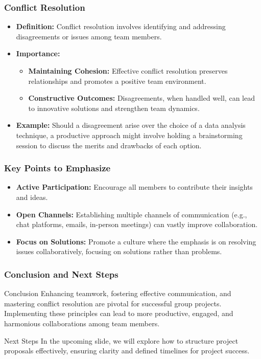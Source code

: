\documentclass[aspectratio=169]{beamer}
\begin{document}
\begin{frame}[fragile]
    \frametitle{Conflict Resolution}
    \begin{itemize}
        \item \textbf{Definition:} Conflict resolution involves identifying and addressing disagreements or issues among team members.
        
        \item \textbf{Importance:}
            \begin{itemize}
                \item \textbf{Maintaining Cohesion:} Effective conflict resolution preserves relationships and promotes a positive team environment.
                \item \textbf{Constructive Outcomes:} Disagreements, when handled well, can lead to innovative solutions and strengthen team dynamics.
            \end{itemize}
        
        \item \textbf{Example:} Should a disagreement arise over the choice of a data analysis technique, a productive approach might involve holding a brainstorming session to discuss the merits and drawbacks of each option.
    \end{itemize}
\end{frame}

\begin{frame}[fragile]
    \frametitle{Key Points to Emphasize}
    \begin{itemize}
        \item \textbf{Active Participation:} Encourage all members to contribute their insights and ideas.
        \item \textbf{Open Channels:} Establishing multiple channels of communication (e.g., chat platforms, emails, in-person meetings) can vastly improve collaboration.
        \item \textbf{Focus on Solutions:} Promote a culture where the emphasis is on resolving issues collaboratively, focusing on solutions rather than problems.
    \end{itemize}
\end{frame}

\begin{frame}[fragile]
    \frametitle{Conclusion and Next Steps}
    \begin{block}{Conclusion}
        Enhancing teamwork, fostering effective communication, and mastering conflict resolution are pivotal for successful group projects. Implementing these principles can lead to more productive, engaged, and harmonious collaborations among team members.
    \end{block}
    
    \begin{block}{Next Steps}
        In the upcoming slide, we will explore how to structure project proposals effectively, ensuring clarity and defined timelines for project success.
    \end{block}
\end{frame}
\end{document}
